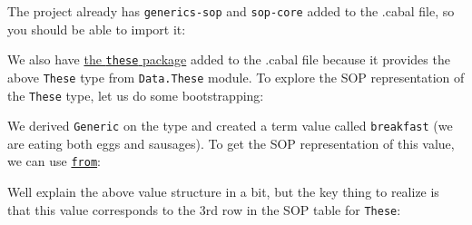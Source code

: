 The project already has \texttt{generics-sop} and \texttt{sop-core}
added to the .cabal file, so you should be able to import it:

\begin{Shaded}
\begin{Highlighting}[]
\OperatorTok{\textgreater{}}  
\end{Highlighting}
\end{Shaded}

We also have
\href{https://hackage.haskell.org/package/these-1.1.1.1/docs/Data-These.html}{the
\texttt{these} package} added to the .cabal file because it provides the
above \texttt{These} type from \texttt{Data.These} module. To explore
the SOP representation of the \texttt{These} type, let us do some
bootstrapping:

\begin{Shaded}
\begin{Highlighting}[]
\OperatorTok{\textgreater{}}   
\OperatorTok{\textgreater{}}  \NormalTok{ (}
\OperatorTok{\textgreater{}} \OtherTok{=}   \OtherTok{ ::}   
\end{Highlighting}
\end{Shaded}

We derived \texttt{Generic} on the type and created a term value called
\texttt{breakfast} (we are eating both eggs and sausages). To get the
SOP representation of this value, we can use
\href{https://hackage.haskell.org/package/generics-sop-0.5.1.2/docs/Generics-SOP.html\#v:from}{\texttt{from}}:

\begin{Shaded}
\begin{Highlighting}[]
\OperatorTok{\textgreater{}}\OperatorTok{$}
\NormalTok{ (}\NormalTok{ (}\NormalTok{ (}  \OperatorTok{:*}   \OperatorTok{:*} \NormalTok{)))}
\end{Highlighting}
\end{Shaded}

Well explain the above value structure in a bit, but the key thing to
realize is that this value corresponds to the 3rd row in the SOP table
for \texttt{These}:

